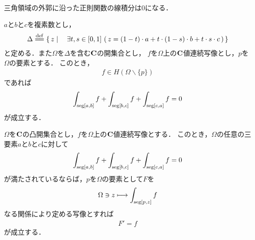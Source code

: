 	三角領域の外郭に沿った正則関数の線積分は$0$になる．
	
	\begin{screen}
		\begin{thm}
			$a$と$b$と$c$を複素数とし，
			\begin{align}
				\Delta \defeq \Set{z}{\exists t,s \in [0,1]\, 
				\left(\, z = (1-t) \cdot a 
				+ t \cdot (1-s) \cdot b 
				+ t \cdot s \cdot c\, \right)}
			\end{align}
			と定める．また$\Omega$を$\Delta$を含む$\mathbf{C}$の開集合とし，
			$f$を$\Omega$上の$\mathbf{C}$値連続写像とし，$p$を$\Omega$の要素とする．
			このとき，
			\begin{align}
				f \in H(\Omega \backslash \{p\})
			\end{align}
			であれば
			\begin{align}
				\int_{\operatorname{seg}[a,b]} f + \int_{\operatorname{seg}[b,c]} f + \int_{\operatorname{seg}[c,a]} f = 0
			\end{align}
			が成立する．
		\end{thm}
	\end{screen}
	
	\begin{screen}
		\begin{thm}
			$\Omega$を$\mathbf{C}$の凸開集合とし，$f$を$\Omega$上の$\mathbf{C}$値連続写像とする．
			このとき，$\Omega$の任意の三要素$a$と$b$と$c$に対して
			\begin{align}
				\int_{\operatorname{seg}[a,b]} f + \int_{\operatorname{seg}[b,c]} f + \int_{\operatorname{seg}[c,a]} f = 0
			\end{align}
			が満たされているならば，$p$を$\Omega$の要素として$F$を
			\begin{align}
				\Omega \ni z \longmapsto \int_{\operatorname{seg}[p,z]} f
			\end{align}
			なる関係により定める写像とすれば
			\begin{align}
				F' = f
			\end{align}
			が成立する．
		\end{thm}
	\end{screen}
	
